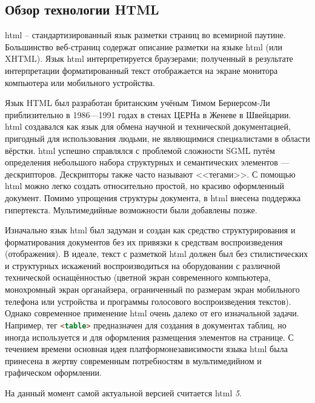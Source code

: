 \subsection{Обзор технологии HTML}

\gls{html} -- стандартизированный язык разметки страниц во всемирной паутине. Большинство веб-страниц содержат описание разметки на языке \gls{html} (или XHTML). Язык \gls{html} интерпретируется браузерами; полученный в результате интерпретации форматированный текст отображается на экране монитора компьютера или мобильного устройства.

Язык HTML был разработан британским учёным Тимом Бернерсом-Ли приблизительно в 1986—1991 годах в стенах ЦЕРНа в Женеве в Швейцарии. \gls{html} создавался как язык для обмена научной и технической документацией, пригодный для использования людьми, не являющимися специалистами в области вёрстки. \gls{html} успешно справлялся с проблемой сложности SGML путём определения небольшого набора структурных и семантических элементов — дескрипторов. Дескрипторы также часто называют <<тегами>>. С помощью \gls{html} можно легко создать относительно простой, но красиво оформленный документ. Помимо упрощения структуры документа, в \gls{html} внесена поддержка гипертекста. Мультимедийные возможности были добавлены позже.

Изначально язык \gls{html} был задуман и создан как средство структурирования и форматирования документов без их привязки к средствам воспроизведения (отображения). В идеале, текст с разметкой \gls{html} должен был без стилистических и структурных искажений воспроизводиться на оборудовании с различной технической оснащённостью (цветной экран современного компьютера, монохромный экран органайзера, ограниченный по размерам экран мобильного телефона или устройства и программы голосового воспроизведения текстов). Однако современное применение \gls{html} очень далеко от его изначальной задачи. Например, тег \lstinline[language=HTML]{<table>} предназначен для создания в документах таблиц, но иногда используется и для оформления размещения элементов на странице. С течением времени основная идея платформонезависимости языка \gls{html} была принесена в жертву современным потребностям в мультимедийном и графическом оформлении.

На данный момент самой актуальной версией считается \gls{html} \textit{5}.